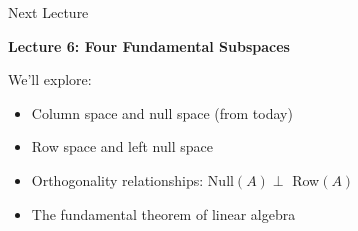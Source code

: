 \documentclass[10pt]{beamer}
\theoremstyle{definition}
\newcommand{\x}[1]{\alert{\textbf{#1}}}
\begin{document}
\begin{frame}{Next Lecture}

\x{Lecture 6: Four Fundamental Subspaces}

\vspace{1em}

We'll explore:
\begin{itemize}
\item Column space and null space (from today)
\item Row space and left null space
\item Orthogonality relationships: Null$(A) \perp $ Row$(A)$
\item The fundamental theorem of linear algebra
\end{itemize}

\end{frame}
\end{document}
